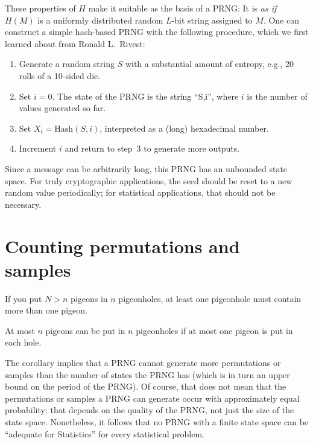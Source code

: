 \documentclass[graybox]{svmult}
\begin{document}
These properties of $H$ make it suitable as the basis of a PRNG:
It is \emph{as if} $H(M)$ is a uniformly distributed random $L$-bit string assigned to $M$.
One can construct a simple hash-based PRNG with the following procedure, which we first learned about
from Ronald L.~Rivest:

\begin{enumerate}
\item Generate a random string $S$ with a substantial amount of entropy, e.g., 20 rolls of a
10-sided die.
\item Set $i=0$. The state of the PRNG is the string ``S,i'', where $i$ is the number of values generated so far. 
\item Set $X_i = {\mbox{Hash}}(S,i)$, interpreted as a (long) hexadecimal number.
\item Increment $i$ and return to step~3 to generate more outputs.
\end{enumerate}

\noindent Since a message can be arbitrarily long, this PRNG has an unbounded state space. For truly cryptographic applications, the seed should be reset to a new random value periodically; for statistical applications, that should not be necessary.

\section{Counting permutations and samples}
\label{sec:count}

\begin{theorem}
If you put $N>n$ pigeons in $n$ pigeonholes, at least one
pigeonhole must contain more than one pigeon.
\end{theorem}

\begin{corollary}
At most $n$ pigeons can be put in $n$ pigeonholes if at most
one pigeon is put in each hole.
\end{corollary}

The corollary implies that a PRNG cannot generate more permutations or samples than the number of states the PRNG has (which is in turn an upper bound on the period of the PRNG).
Of course, that does not mean that the permutations or samples a PRNG can generate occur with approximately equal probability: that depends on the quality of the PRNG, not just the size of the state space. 
Nonetheless, it follows that no PRNG with a finite state space can be ``adequate for Statistics'' for every statistical problem.
\end{document}
